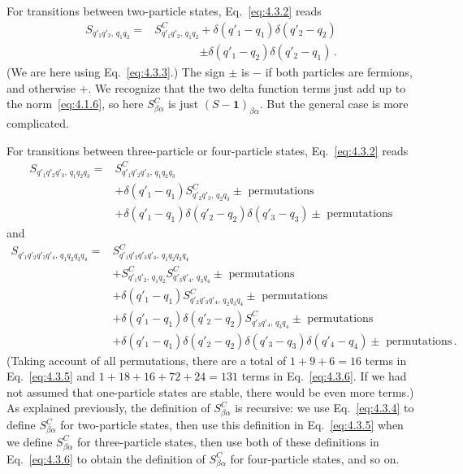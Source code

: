 For transitions between two-particle states, Eq.~\eqref{eq:4.3.2} reads
\begin{equation}
\begin{aligned}
S_{q'_1q'_2,\,q_1q_2}
={}&S^C_{q'_1q'_2,\,q_1q_2}
+\delta(q'_1-q_1)\delta(q'_2-q_2) \\
&\mathrel{\phantom{S^C_{q'_1q'_2,\,q_1q_2}}}
\mathord{\pm}\delta(q'_1-q_2)\delta(q'_2-q_1)\,.
\end{aligned}
\tag{4.3.4}
\label{eq:4.3.4}
\end{equation}
(We are here using Eq.~\eqref{eq:4.3.3}.) The sign $\pm$ is $-$ if both particles are
fermions, and otherwise $+$. We recognize that the two delta function terms
just add up to the norm~\eqref{eq:4.1.6}, so here $S^C_{\beta\alpha}$ is just
$(S-\mathbf{1})_{\beta\alpha}$. But the general case is more complicated.

For transitions between three-particle or four-particle states, Eq.~\eqref{eq:4.3.2}
reads
\begin{equation}
\begin{aligned}
S_{q'_1q'_2q'_3,\,q_1q_2q_3}
={}&S^C_{q'_1q'_2q'_3,\,q_1q_2q_3} \\
&+\delta(q'_1-q_1)S^C_{q'_2q'_3,\,q_2q_3}
  \mathbin{\pm}\text{ permutations} \\
&+\delta(q'_1-q_1)\delta(q'_2-q_2)\delta(q'_3-q_3)
  \mathbin{\pm}\text{ permutations}
\end{aligned}
\tag{4.3.5}
\label{eq:4.3.5}
\end{equation}
and
\begin{equation}
\begin{aligned}
S_{q'_1q'_2q'_3q'_4,\,q_1q_2q_3q_4}
={}&S^C_{q'_1q'_2q'_3q'_4,\,q_1q_2q_3q_4} \\
&+S^C_{q'_1q'_2,\,q_1q_2}S^C_{q'_3q'_4,\,q_3q_4}
  \mathbin{\pm}\text{ permutations} \\
&+\delta(q'_1-q_1)S^C_{q'_2q'_3q'_4,\,q_2q_3q_4}
  \mathbin{\pm}\text{ permutations} \\
&+\delta(q'_1-q_1)\delta(q'_2-q_2)S^C_{q'_3q'_4,\,q_3q_4}
  \mathbin{\pm}\text{ permutations} \\
&+\delta(q'_1-q_1)\delta(q'_2-q_2)\delta(q'_3-q_3)\delta(q'_4-q_4)
  \mathbin{\pm}\text{ permutations}\,.
\end{aligned}
\tag{4.3.6}
\label{eq:4.3.6}
\end{equation}
(Taking account of all permutations, there are a total of $1+9+6=16$
terms in Eq.~\eqref{eq:4.3.5} and $1+18+16+72+24=131$ terms in Eq.~\eqref{eq:4.3.6}.
If we had not assumed that one-particle states are stable, there would be
even more terms.) As explained previously, the definition of
$S^C_{\beta\alpha}$ is recursive: we use Eq.~\eqref{eq:4.3.4} to define
$S^C_{\beta\alpha}$ for two-particle states, then use this definition in
Eq.~\eqref{eq:4.3.5} when we define $S^C_{\beta\alpha}$ for three-particle states,
then use both of these definitions in Eq.~\eqref{eq:4.3.6} to obtain the definition of
$S^C_{\beta\alpha}$ for four-particle states, and so on.

